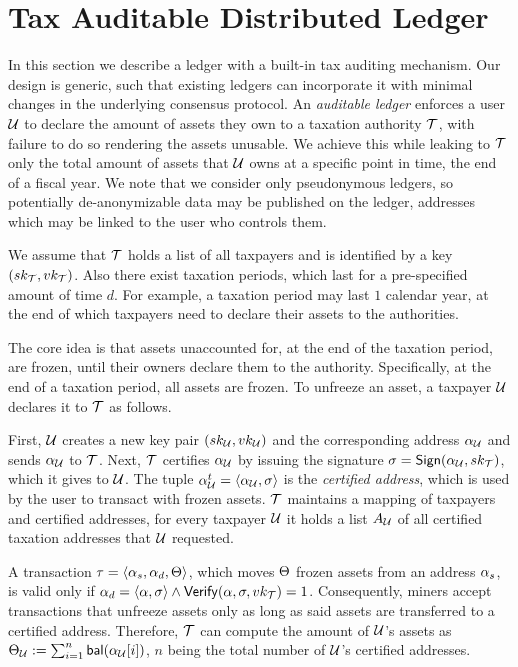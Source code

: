 \section{Tax Auditable Distributed Ledger}\label{sec:taxchain}

In this section we describe a ledger with a built-in tax auditing mechanism.
Our design is generic, such that existing ledgers can incorporate it with
minimal changes in the underlying consensus protocol. An \emph{auditable
ledger} enforces a user $\mathcal{U}$ to declare the amount of assets they own to a
taxation authority $\mathcal{T}$, with failure to do so rendering the assets
unusable. We achieve this while leaking to $\mathcal{T}$ only the total amount of
assets that $\mathcal{U}$ owns at a specific point in time, \eg the end of a fiscal
year. We note that we consider only pseudonymous ledgers, so potentially
de-anonymizable data may be published on the ledger, \eg addresses which may be
linked to the user who controls them.

We assume that $\mathcal{T}$ holds a list of all taxpayers and is identified by a
key $(sk_{\mathcal{T}}, vk_{\mathcal{T}})$. Also there exist taxation
periods, which last for a pre-specified amount of time $d$. For example, a
taxation period may last $1$ calendar year, at the end of which taxpayers need
to declare their assets to the authorities.

The core idea is that assets unaccounted for, at the end of the taxation
period, are frozen, until their owners declare them to the authority.
Specifically, at the end of a taxation period, all assets are frozen. To
unfreeze an asset, a taxpayer $\mathcal{U}$ declares it to $\mathcal{T}$ as follows.

First, $\mathcal{U}$ creates a new key pair $(sk_{\mathcal{U}}, vk_{\mathcal{U}})$
and the corresponding address $\alpha_{\mathcal{U}}$ and sends $\alpha_{\mathcal{U}}$
to $\mathcal{T}$.  Next, $\mathcal{T}$ certifies $\alpha_{\mathcal{U}}$ by issuing the
signature $\sigma = \mathsf{Sign}(\alpha_{\mathcal{U}}, sk_{\mathcal{T}})$, which it
gives to $\mathcal{U}$. The tuple $\alpha_{\mathcal{U}}^{t} = \langle \alpha_{\mathcal{U}},
\sigma \rangle$ is the \emph{certified address}, which is used by the user to
transact with frozen assets. $\mathcal{T}$ maintains a mapping of taxpayers and
certified addresses, \ie for every taxpayer $\mathcal{U}$ it holds a list $A_\mathcal{U}$
of all certified taxation addresses that $\mathcal{U}$ requested.

A transaction $\tau = \langle \alpha_{s}, \alpha_{d}, \Theta \rangle$,
which moves $\Theta$ frozen assets from an address $\alpha_{s}$, is valid
only if $\alpha_{d} = \langle \alpha, \sigma \rangle \land
\mathsf{Verify}(\alpha, \sigma, vk_{\mathcal{T}}) = 1$. Consequently, miners
accept transactions that unfreeze assets only as long as said assets are
transferred to a certified address. Therefore, $\mathcal{T}$ can compute the
amount of $\mathcal{U}$'s assets as $\Theta_\mathcal{U} := \sum_{i=1}^{n}
\mathsf{bal}(\alpha_{\mathcal{U}}[i])$, $n$ being the total number of $\mathcal{U}$'s
certified addresses.

